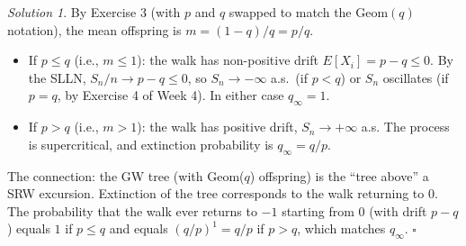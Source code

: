 \documentclass[12pt]{article}
\theoremstyle{remark}
\newtheorem*{solution}{Solution}
\begin{document}
\begin{solution}
By Exercise 3 (with $p$ and $q$ swapped to match the Geom$(q)$ notation),
the mean offspring is $m = (1-q)/q = p/q$.

\begin{itemize}
  \item If $p \le q$ (i.e., $m \le 1$): the walk has non-positive drift $E[X_i] = p - q \le 0$.
        By the SLLN, $S_n/n \to p - q \le 0$, so $S_n \to -\infty$ a.s.\ (if $p < q$) or
        $S_n$ oscillates (if $p = q$, by Exercise 4 of Week 4).  In either case $q_\infty = 1$.
  \item If $p > q$ (i.e., $m > 1$): the walk has positive drift, $S_n \to +\infty$ a.s.
        The process is supercritical, and extinction probability is $q_\infty = q/p$.
\end{itemize}

The connection: the GW tree (with Geom($q$) offspring) is the ``tree above'' a SRW
excursion.  Extinction of the tree corresponds to the walk returning to $0$.  The
probability that the walk ever returns to $-1$ starting from $0$ (with drift $p - q$) equals
$1$ if $p \le q$ and equals $(q/p)^1 = q/p$ if $p > q$, which matches $q_\infty$.
\hfill$\square$
\end{solution}
\end{document}

